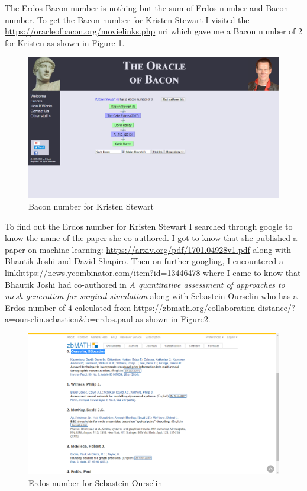 \documentclass[letterpaper,11pt]{article}
\begin{document}
The Erdos-Bacon number is nothing but the sum of Erdos number and Bacon number.
To get the Bacon number for Kristen Stewart I visited the \url{https://oracleofbacon.org/movielinks.php} uri which gave me a Bacon number of 2 for Kristen as shown in Figure \ref{fig:q6bacon}.


\begin{figure}[h]
\centering
\includegraphics[scale=0.3]{bacon.png}
\caption{Bacon number for Kristen Stewart}
\label{fig:q6bacon}
\end{figure}



To find out the Erdos number for Kristen Stewart I searched through google to know the name of the paper she co-authored. I got to know that she published a paper on machine learning: \url{https://arxiv.org/pdf/1701.04928v1.pdf} along with Bhautik Joshi and David Shapiro. Then on further googling, I encountered a link\url{https://news.ycombinator.com/item?id=13446478} where I came to know that Bhautik Joshi had co-authored in \emph{A quantitative assessment of approaches to mesh generation for surgical simulation} along with Sebastein Ourselin who has a Erdos number of 4 calculated from \url{https://zbmath.org/collaboration-distance/?a=ourselin.sebastien&b=erdos.paul} as shown in Figure\ref{fig:q6erdos}. 


\begin{figure}[h]
\centering
\includegraphics[scale=0.3]{erdos.png}
\caption{Erdos number for Sebastein Ourselin}
\label{fig:q6erdos}
\end{figure}
\end{document}
